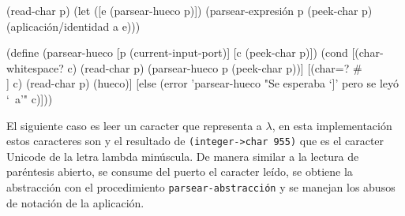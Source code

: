 \documentclass[letterpaper,twoside,openright,11pt]{book}
\begin{document}
\nwenddocs{}\endmoddef
(read-char p)
(let ([e (parsear-hueco p)])
  (parsear-expresión p (peek-char p) (aplicación/identidad a e)))
\nwendcode{}\nwdocspar

\nwenddocs{}\plusendmoddef
(define (parsear-hueco [p (current-input-port)]
                       [c (peek-char p)])
  (cond [(char-whitespace? c)
         (read-char p)
         (parsear-hueco p (peek-char p))]
        [(char=? #\\] c)
         (read-char p)
         (hueco)]
        [else
         (error 'parsear-hueco
                "Se esperaba `]' pero se leyó `~a'" c)]))

\eatline
{}\nwendcode{}\nwdocspar


El siguiente caso es leer un caracter que representa a \( λ \), en esta implementación estos caracteres son {\tt{}{}{}{}} y el resultado de {\tt{}(integer->char\ 955)} que es el caracter Unicode de la letra lambda minúscula. De manera similar a la lectura de paréntesis abierto, se consume del puerto el caracter leído, se obtiene la abstracción con el procedimiento {\tt{}parsear-\protect{}abstracción\protect{}} y se manejan los abusos de notación de la aplicación.
\end{document}
